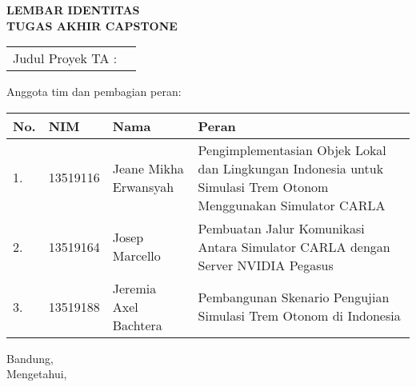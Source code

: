 \clearpage
\pagestyle{empty}

\begin{center}
	\smallskip

	\Large \bfseries \MakeUppercase{
		Lembar Identitas \\
		Tugas Akhir Capstone
	}
	\vspace{0.5cm}

	\raggedright
	\begin{table}[h!]
		\large \bfseries
		\begin{onehalfspace}
		\begin{tabular}{p{} p{}}
			Judul Proyek TA : & \capstonetitle \\
		\end{tabular}
		\end{onehalfspace}
	\end{table}

	\normalsize \normalfont

	Anggota tim dan pembagian peran:

	\begin{table}[h!]
		\begin{onehalfspace}
		\begingroup
		\def\arraystretch{1.25}
		\begin{tabular}{|p{} | p{} | p{} | p{0.50\textwidth}|}
			\hline
			\textbf{No.} & \textbf{NIM} & \textbf{Nama}         & \textbf{Peran}                                                                                                 \\
			\hline
			1.           & 13519116     & Jeane Mikha Erwansyah & Pengimplementasian Objek Lokal dan Lingkungan Indonesia untuk Simulasi Trem Otonom Menggunakan Simulator CARLA \\
			\hline
			2.           & 13519164     & Josep Marcello        & Pembuatan Jalur Komunikasi Antara Simulator CARLA dengan Server NVIDIA Pegasus                                 \\
			\hline
			3.           & 13519188     & Jeremia Axel Bachtera & Pembangunan Skenario Pengujian Simulasi Trem Otonom di Indonesia                                               \\
			\hline
		\end{tabular}
		\endgroup
		\end{onehalfspace}
	\end{table}

	\vfill
	\begin{center}
		\normalsize \normalfont
		Bandung, \thedate \\
		Mengetahui,
	\end{center}
	\advisorapproval

\end{center}
\clearpage
